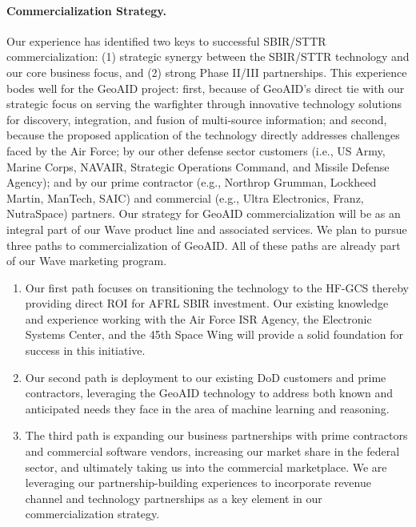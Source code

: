 \documentclass{sbir}
\begin{document}
\paragraph{Commercialization Strategy.} Our experience has identified two keys to successful SBIR/STTR commercialization: (1) strategic synergy between the SBIR/STTR technology and our core business focus, and (2) strong Phase II/III partnerships.
This experience bodes well for the GeoAID project: first, because of GeoAID's direct tie with our strategic focus on serving the warfighter through innovative technology solutions for discovery, integration, and fusion of multi-source information; and second, because the proposed application of the technology directly addresses challenges faced by the Air Force; by our other defense sector customers (i.e., US Army, Marine Corps, NAVAIR, Strategic Operations Command, and Missile Defense Agency); and by our prime contractor (e.g., Northrop Grumman, Lockheed Martin, ManTech, SAIC) and commercial (e.g., Ultra Electronics, Franz, NutraSpace) partners.
Our strategy for GeoAID commercialization will be as an integral part of our Wave product line and associated services. We plan to pursue three paths to commercialization of GeoAID. All of these paths are already part of our Wave marketing program.
\begin{enumerate}
  \item Our first path focuses on transitioning the technology to the HF-GCS thereby providing direct ROI for AFRL SBIR investment. Our existing knowledge and experience working with the Air Force ISR Agency, the Electronic Systems Center, and the 45th Space Wing will provide a solid foundation for success in this initiative.
  \item Our second path is deployment to our existing DoD customers and prime contractors, leveraging the GeoAID technology to address both known and anticipated needs they face in the area of machine learning and reasoning.
  \item The third path is expanding our business partnerships with prime contractors and commercial software vendors, increasing our market share in the federal sector, and ultimately taking us into the commercial marketplace. We are leveraging our partnership-building experiences to incorporate revenue channel and technology partnerships as a key element in our commercialization strategy.
\end{enumerate}
\end{document}
